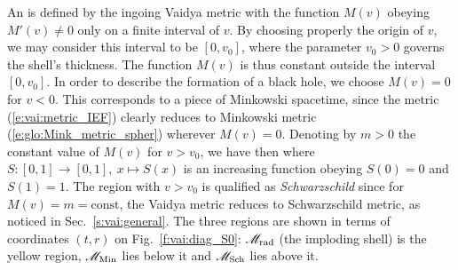 An 
is defined by the ingoing Vaidya metric with the function $M(v)$ obeying
$M'(v) \neq 0$ only on a finite interval of $v$. By choosing properly
the origin of $v$, we may consider this interval to be $[0, v_0]$, where
the parameter $v_0>0$ governs the shell's thickness.
The function $M(v)$ is thus constant outside the interval $[0, v_0]$.
In order to describe the formation of a black hole, we choose
$M(v) = 0$ for $v < 0$. This corresponds to a piece of Minkowski spacetime,
since the metric (\ref{e:vai:metric_IEF})
clearly reduces to Minkowski metric (\ref{e:glo:Mink_metric_spher}) wherever $M(v)=0$.
Denoting by $m>0$ the constant value of $M(v)$ for $v > v_0$, we have then
\be \label{e:vai:mass_function}
\ee
where $S: [0,1] \to [0,1],\ x \mapsto S(x)$ is an increasing function
obeying $S(0) = 0$ and $S(1) = 1$.
The region with $v>v_0$ is qualified as \emph{Schwarzschild} since for $M(v) = m = \mathrm{const}$,
the Vaidya metric reduces to Schwarzschild metric, as noticed
in Sec.~\ref{s:vai:general}.
The three regions are shown in terms of coordinates $(t, r)$ on Fig.~\ref{f:vai:diag_S0}:
$\mathscr{M}_{\rm rad}$ (the imploding shell) is the yellow region, $\mathscr{M}_{\rm Min}$ lies below it and
$\mathscr{M}_{\rm Sch}$ lies above it.


